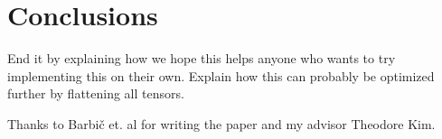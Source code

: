 \documentclass[twocolumn,10pt]{asme2ej}
\begin{document}
\section{Conclusions}

End it by explaining how we hope this helps anyone who wants to try implementing this on their own.
Explain how this can probably be optimized further by flattening all tensors.

\begin{acknowledgment}

Thanks to Barbič et. al for writing the paper and my advisor Theodore Kim.

\end{acknowledgment}






%
\end{document}
